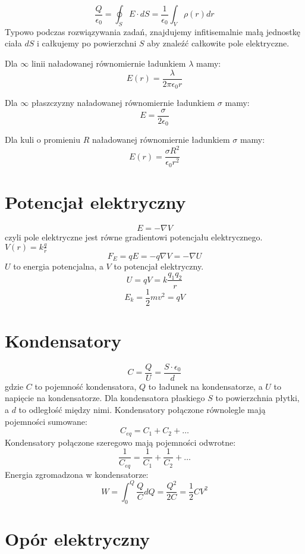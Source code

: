 \documentclass{../konspekt}
\begin{document}
\begin{multicols}{2}
  $$
  \frac{Q}{\epsilon_0} = \oint_S E \cdot dS = \frac{1}{\epsilon_0}
  \int_V \rho(r) dr
  $$
  Typowo podczas rozwiązywania zadań, znajdujemy infitisemalnie małą jednostkę
  ciała $dS$ i całkujemy po powierzchni $S$ aby znaleźć całkowite pole
  elektryczne.

  \begin{multicols}{3}
    \noindent
    Dla $\infty$ linii naładowanej równomiernie
    ładunkiem $\lambda$ mamy:
    $$
    E(r) = \frac{\lambda}{2\pi\epsilon_0 r}
    $$

    \noindent
    Dla $\infty$ płaszczyzny naładowanej równomiernie
    ładunkiem $\sigma$ mamy:
    $$
    E = \frac{\sigma}{2\epsilon_0}
    $$

    \noindent
    Dla kuli o promieniu $R$ naładowanej równomiernie
    ładunkiem $\sigma$ mamy:
    $$
    E(r) = \frac{\sigma R^2}{\epsilon_0 r^2}
    $$
  \end{multicols}

  \section{Potencjał elektryczny}

  $$
  E = - \nabla V
  $$
  czyli pole elektryczne jest równe gradientowi potencjału
  elektrycznego. $V(r) = k\frac{q}{r}$
  $$
  F_E = qE = -q \nabla V = - \nabla U
  $$
  $U$ to energia potencjalna, a $V$ to potencjał elektryczny.
  $$
  U = qV = k \frac{q_1 q_2}{r}
  $$
  $$
  E_k = \frac{1}{2} m v^2 = qV
  $$

  \section{Kondensatory}

  $$
  C = \frac{Q}{U} = \frac{S \cdot \epsilon_0}{d}
  $$
  gdzie $C$ to pojemność kondensatora, $Q$ to ładunek na
  kondensatorze, a $U$ to napięcie na kondensatorze. Dla kondensatora
  płaskiego $S$ to powierzchnia płytki, a $d$ to odległość między
  nimi. Kondensatory połączone równolegle mają pojemności sumowane:
  $$
  C_{eq} = C_1 + C_2 + \ldots
  $$
  Kondensatory połączone szeregowo mają pojemności odwrotne:
  $$
  \frac{1}{C_{eq}} = \frac{1}{C_1} + \frac{1}{C_2} + \ldots
  $$
  Energia zgromadzona w kondensatorze:
  $$
  W = \int_{0}^{Q} \frac{Q}{C} dQ = \frac{Q^2}{2C} = \frac{1}{2} C V^2
  $$

  \section{Opór elektryczny}


\end{multicols}
\end{document}
